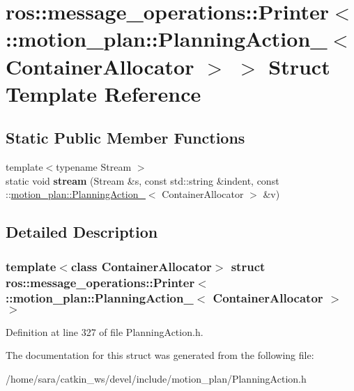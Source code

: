 \hypertarget{structros_1_1message__operations_1_1Printer_3_01_1_1motion__plan_1_1PlanningAction___3_01ContainerAllocator_01_4_01_4}{}\section{ros\+:\+:message\+\_\+operations\+:\+:Printer$<$ \+:\+:motion\+\_\+plan\+:\+:Planning\+Action\+\_\+$<$ Container\+Allocator $>$ $>$ Struct Template Reference}
\label{structros_1_1message__operations_1_1Printer_3_01_1_1motion__plan_1_1PlanningAction___3_01ContainerAllocator_01_4_01_4}
\subsection*{Static Public Member Functions}
\begin{DoxyCompactItemize}
\item 
\mbox{\label{structros_1_1message__operations_1_1Printer_3_01_1_1motion__plan_1_1PlanningAction___3_01ContainerAllocator_01_4_01_4_ad5baf5d525607cfdc7e4ee53a6a7dc6e}} 
{\footnotesize template$<$typename Stream $>$ }\\static void {\bfseries stream} (Stream \&s, const std\+::string \&indent, const \+::\hyperlink{structmotion__plan_1_1PlanningAction__}{motion\+\_\+plan\+::\+Planning\+Action\+\_\+}$<$ Container\+Allocator $>$ \&v)
\end{DoxyCompactItemize}


\subsection{Detailed Description}
\subsubsection*{template$<$class Container\+Allocator$>$\newline
struct ros\+::message\+\_\+operations\+::\+Printer$<$ \+::motion\+\_\+plan\+::\+Planning\+Action\+\_\+$<$ Container\+Allocator $>$ $>$}



Definition at line 327 of file Planning\+Action.\+h.



The documentation for this struct was generated from the following file\+:\begin{DoxyCompactItemize}
\item 
/home/sara/catkin\+\_\+ws/devel/include/motion\+\_\+plan/Planning\+Action.\+h\end{DoxyCompactItemize}
